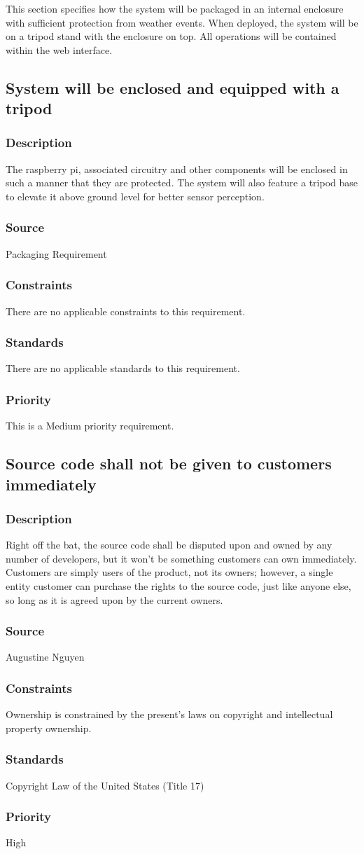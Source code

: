 This section specifies how the system will be packaged in an internal enclosure with sufficient protection from weather events. When deployed, the system will be on a tripod stand with the enclosure on top. All operations will be contained within the web interface.

\subsection{System will be enclosed and equipped with a tripod}
\subsubsection{Description}
The raspberry pi, associated circuitry and other components will be enclosed in such a manner that they are protected. The system will also feature a tripod base to elevate it above ground level for better sensor perception.
\subsubsection{Source}
Packaging Requirement
\subsubsection{Constraints}
There are no applicable constraints to this requirement.
\subsubsection{Standards}
There are no applicable standards to this requirement.
\subsubsection{Priority}
This is a Medium priority requirement.

\subsection{Source code shall not be given to customers immediately}
\subsubsection{Description}
Right off the bat, the source code shall be disputed upon and owned by any number of developers, but it won't be something customers can own immediately.  Customers are simply users of the product, not its owners; however, a single entity customer can purchase the rights to the source code, just like anyone else, so long as it is agreed upon by the current owners.
\subsubsection{Source}
Augustine Nguyen
\subsubsection{Constraints}
Ownership is constrained by the present's laws on copyright and intellectual property ownership.
\subsubsection{Standards}
Copyright Law of the United States (Title 17)
\subsubsection{Priority}
High
